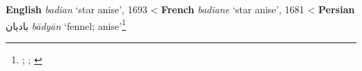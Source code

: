 \begin{etymology}\label{ety:badian}
\textbf{English} \textit{badian} `star anise', 1693
< \textbf{French} \textit{badiane} `star anise', 1681
< \textbf{Persian} {بادیان} \textit{bādyān} `fennel; anise'\footnote{\textcite{oed}; \textcite{tlfi}; \textcites[140]{steingass_comprehensive_1892}[197]{hayyim_new_1934}}
\end{etymology}